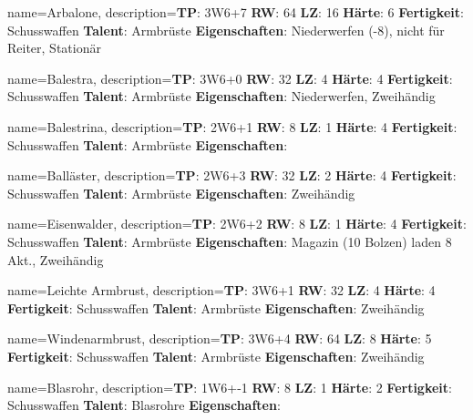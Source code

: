 {
    name={Arbalone},
    description={\textbf{TP}: 3W6+7 \textbf{RW}: 64 \textbf{LZ}: 16 \textbf{Härte}: 6        \textbf{Fertigkeit}: Schusswaffen \textbf{Talent}: Armbrüste \textbf{{Eigenschaften}}: Niederwerfen (-8), nicht für Reiter, Stationär}
}



{
    name={Balestra},
    description={\textbf{TP}: 3W6+0 \textbf{RW}: 32 \textbf{LZ}: 4 \textbf{Härte}: 4        \textbf{Fertigkeit}: Schusswaffen \textbf{Talent}: Armbrüste \textbf{{Eigenschaften}}: Niederwerfen, Zweihändig}
}



{
    name={Balestrina},
    description={\textbf{TP}: 2W6+1 \textbf{RW}: 8 \textbf{LZ}: 1 \textbf{Härte}: 4        \textbf{Fertigkeit}: Schusswaffen \textbf{Talent}: Armbrüste \textbf{{Eigenschaften}}: }
}



{
    name={Balläster},
    description={\textbf{TP}: 2W6+3 \textbf{RW}: 32 \textbf{LZ}: 2 \textbf{Härte}: 4        \textbf{Fertigkeit}: Schusswaffen \textbf{Talent}: Armbrüste \textbf{{Eigenschaften}}: Zweihändig}
}



{
    name={Eisenwalder},
    description={\textbf{TP}: 2W6+2 \textbf{RW}: 8 \textbf{LZ}: 1 \textbf{Härte}: 4        \textbf{Fertigkeit}: Schusswaffen \textbf{Talent}: Armbrüste \textbf{{Eigenschaften}}: Magazin (10 Bolzen) laden 8 Akt., Zweihändig}
}



{
    name={Leichte Armbrust},
    description={\textbf{TP}: 3W6+1 \textbf{RW}: 32 \textbf{LZ}: 4 \textbf{Härte}: 4        \textbf{Fertigkeit}: Schusswaffen \textbf{Talent}: Armbrüste \textbf{{Eigenschaften}}: Zweihändig}
}



{
    name={Windenarmbrust},
    description={\textbf{TP}: 3W6+4 \textbf{RW}: 64 \textbf{LZ}: 8 \textbf{Härte}: 5        \textbf{Fertigkeit}: Schusswaffen \textbf{Talent}: Armbrüste \textbf{{Eigenschaften}}: Zweihändig}
}



{
    name={Blasrohr},
    description={\textbf{TP}: 1W6+-1 \textbf{RW}: 8 \textbf{LZ}: 1 \textbf{Härte}: 2        \textbf{Fertigkeit}: Schusswaffen \textbf{Talent}: Blasrohre \textbf{{Eigenschaften}}: }
}



